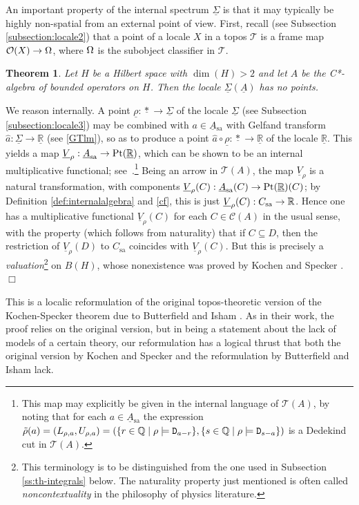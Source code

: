 \documentclass[12pt]{article}
\newcommand{\raw}{\rightarrow} \newcommand{\rat}{\mapsto}
\newcommand{\er}{\eqref}
\newcommand{\rh}{\rho} \newcommand{\sg}{\sigma}
\newcommand{\CA}{{\mathcal A}} \newcommand{\CB}{{\mathcal B}}
\newcommand{\CO}{{\mathcal O}} \newcommand{\CP}{{\mathcal P}}
\newcommand{\CT}{{\mathcal T}} \newcommand{\CV}{{\mathcal V}}
\newcommand{\alg}[1]{\ensuremath{#1}}
\newcommand{\functor}[1]{\ensuremath{\underline{#1}}}
\newcommand{\context}{\ensuremath{\mathcal{C}}}
\newcommand{\asstopos}{\ensuremath{\mathcal{T}}}
\newcommand{\sa}{\ensuremath{_{\mathrm{sa}}}}
\newcommand{\prop}[1]{\ensuremath{\mbox{\texttt{#1}}}}
\newcommand{\field}[1]{\ensuremath{\mathbb{#1}}}
\newcommand{\uA}{\underline{A}}
\renewcommand{\CA}{\mathcal{C}(A)}
\newcommand{\TA}{\mathcal{T}(A)}
\newcommand{\ulS}{\functor{\Sigma}}
\newcommand{\ulR}{\underline{\mathbb{R}}}
\renewcommand{\TA}{\asstopos(\alg{A})}
\renewcommand{\CA}{\context(\alg{A})}
\newtheorem{theorem}{Theorem}
\newenvironment{proof}[1][Proof]%
{ \begin{trivlist}%
  \item[\hskip \labelsep {\bfseries #1}]%
}%
{ \end{trivlist}%
}
\newcommand{\qed}{\nobreak\hfill$\Box$}
\begin{document}
An important property of the  internal spectrum $\underline{\Sigma}$  is that it may
typically be
highly non-spatial from an external point of view. First, recall (see
Subsection \ref{subsection:locale2}) that a point of a locale
$X$ in a topos $\CT$ is a frame map $\CO(X)\raw\Om$, where $\Omega$ is the
subobject classifier in $\CT$.
\begin{theorem}
  \label{prop:kochenspecker}
  Let $H$ be a Hilbert space with $\dim(H)>2$ and let $\alg{A}$ be the
  C*-algebra of bounded operators on $H$. Then the locale $\ulS(\uA)$
  has no  points.
\end{theorem}
\begin{proof}
We reason internally. 
 A point $\underline{\rh}:\underline{*}\raw \ulS$  of the locale $\ulS$ (see Subsection \ref{subsection:locale3})
 may be combined with $a\in\uA\sa$ with Gelfand transform $\hat{a}:\ulS\raw \ulR$ (see \er{GTlm}),  so as to produce a point
 $\hat{a}\circ \underline{\rh}:\underline{*}\raw\ulR$ of the locale $\ulR$. This yields a map 
 $\underline{V}_{\rh}: \uA\sa \to\mathrm{Pt}(\underline\R)$, which can be shown to be an internal multiplicative functional;
see~\cite{banaschewskimulvey00a, banaschewskimulvey06, coquand05}.\footnote{This map
may explicitly be given in the internal language of $\TA$, by noting that
 for each  $a\in \uA\sa$ the expression $
    \tilde{\rh}(a)
  = (L_{\rh,a},U_{\rh,a})
  = (\{r \in \field{Q} \mid \rho \models \prop{D}_{a-r}\},
     \{s \in \field{Q} \mid \rho\models \prop{D}_{s-a} \})$ is a Dedekind
cut in $\TA$.} Being an arrow in $\TA$, the map $\underline{V}_{\rh}$
 is a natural transformation, with components $\underline{V}_{\rh}(C): \uA\sa(C) \raw\mathrm{Pt}(\underline\R)(C)$;
 by Definition \ref{def:internalalgebra} and \er{cf}, this is just  $\underline{V}_{\rh}(C):C\sa\raw \R$. 
 Hence one has a multiplicative functional $\underline{V}_{\rh}(C)$ for each $C\in\CA$ in
the usual sense,
with the property (which follows from naturality) that if $C\subseteq D$, then the restriction of  $\underline{V}_{\rh}(D)$
to $C\sa$ coincides with  $\underline{V}_{\rh}(C)$.
But this is precisely a {\it valuation}\footnote{This terminology is to be
distinguished from the one used in Subsection \ref{ss:th-integrals} below. The naturality property just mentioned is often called {\it noncontextuality} in the philosophy of physics literature.}  on
$B(H)$, whose nonexistence was proved by Kochen and Specker
\cite{kochenspecker67}. \qed
\end{proof}

This is a localic reformulation of the original topos-theoretic version of the
Kochen-Specker theorem due to Butterfield and Isham \cite{butterfieldisham1}. As
in their work, the proof relies on the original version, but in being a statement about the lack of models of a certain theory,  our reformulation has a logical thrust that both the original version by Kochen and Specker and the
reformulation by Butterfield and Isham lack. 
\end{document}
